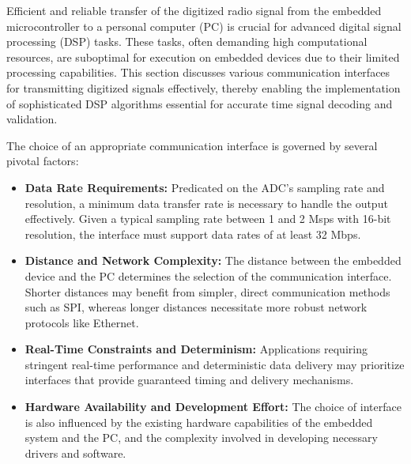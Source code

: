 \documentclass[12pt, a4paper]{extarticle}
\begin{document}
Efficient and reliable transfer of the digitized radio signal from the embedded
microcontroller to a personal computer (PC) is crucial for advanced digital
signal processing (DSP) tasks. These tasks, often demanding high computational
resources, are suboptimal for execution on embedded devices due to their
limited processing capabilities. This section discusses various communication
interfaces for transmitting digitized signals effectively, thereby enabling the
implementation of sophisticated DSP algorithms essential for accurate time
signal decoding and validation.

The choice of an appropriate communication interface is governed by several
pivotal factors:
\begin{itemize}[noitemsep]
    \item \textbf{Data Rate Requirements:} Predicated on the ADC's sampling
        rate and resolution, a minimum data transfer rate is necessary to
        handle the output effectively. Given a typical sampling rate between 1
        and 2 Msps with 16-bit resolution, the interface must support data
        rates of at least 32 Mbps.
    \item \textbf{Distance and Network Complexity:} The distance between the
        embedded device and the PC determines the selection of the
        communication interface. Shorter distances may benefit from simpler,
        direct communication methods such as SPI, whereas longer distances
        necessitate more robust network protocols like Ethernet.
    \item \textbf{Real-Time Constraints and Determinism:} Applications
        requiring stringent real-time performance and deterministic data
        delivery may prioritize interfaces that provide guaranteed timing and
        delivery mechanisms.
    \item \textbf{Hardware Availability and Development Effort:} The choice of
        interface is also influenced by the existing hardware capabilities of
        the embedded system and the PC, and the complexity involved in
        developing necessary drivers and software.
\end{itemize}
\end{document}
